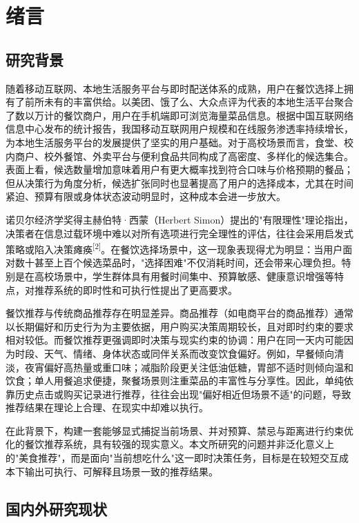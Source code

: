 \chapter{绪言}

\section{研究背景}

随着移动互联网、本地生活服务平台与即时配送体系的成熟，用户在餐饮选择上拥有了前所未有的丰富供给。以美团、饿了么、大众点评为代表的本地生活平台聚合了数以万计的餐饮商户，用户在手机端即可浏览海量菜品信息。根据中国互联网络信息中心发布的统计报告，我国移动互联网用户规模和在线服务渗透率持续增长，为本地生活服务平台的发展提供了坚实的用户基础\super{[1]}。对于高校场景而言，食堂、校内商户、校外餐馆、外卖平台与便利食品共同构成了高密度、多样化的候选集合。表面上看，候选数量增加意味着用户有更大概率找到符合口味与价格预期的餐品；但从决策行为角度分析，候选扩张同时也显著提高了用户的选择成本，尤其在时间紧迫、预算有限或身体状态波动明显时，这种成本会进一步放大。

诺贝尔经济学奖得主赫伯特·西蒙（Herbert Simon）提出的"有限理性"理论指出，决策者在信息过载环境中难以对所有选项进行完全理性的评估，往往会采用启发式策略或陷入决策瘫痪\textsuperscript{[2]}。在餐饮选择场景中，这一现象表现得尤为明显：当用户面对数十甚至上百个候选菜品时，"选择困难"不仅消耗时间，还会带来心理负担。特别是在高校场景中，学生群体具有用餐时间集中、预算敏感、健康意识增强等特点，对推荐系统的即时性和可执行性提出了更高要求。

餐饮推荐与传统商品推荐存在明显差异。商品推荐（如电商平台的商品推荐）通常以长期偏好和历史行为为主要依据，用户购买决策周期较长，且对即时约束的要求相对较低。而餐饮推荐更强调即时决策与现实约束的协调：用户在同一天内可能因为时段、天气、情绪、身体状态或同伴关系而改变饮食偏好。例如，早餐倾向清淡，夜宵偏好高热量或重口味；减脂阶段更关注低油低糖，胃部不适时则倾向温和饮食；单人用餐追求便捷，聚餐场景则注重菜品的丰富性与分享性。因此，单纯依靠历史点击或购买记录进行推荐，往往会出现"偏好相近但场景不适"的问题，导致推荐结果在理论上合理、在现实中却难以执行。

在此背景下，构建一套能够显式捕捉当前场景、并对预算、禁忌与距离进行约束优化的餐饮推荐系统，具有较强的现实意义。本文所研究的问题并非泛化意义上的"美食推荐"，而是面向"当前想吃什么"这一即时决策任务，目标是在较短交互成本下输出可执行、可解释且场景一致的推荐结果。

\section{国内外研究现状}

